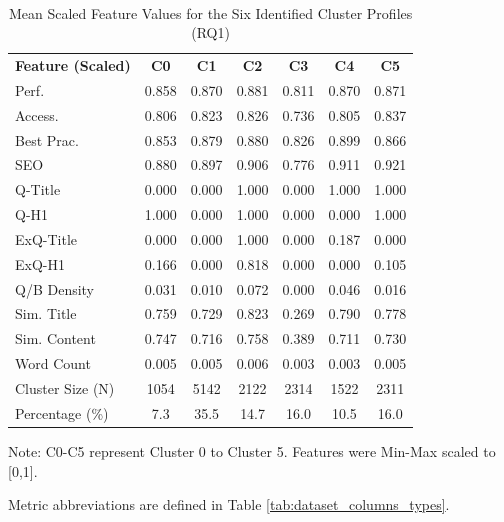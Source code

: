 \documentclass[a4paper,fleqn]{cas-sc}
\newcommand{\sbf}[1]{\scriptsize\textbf{#1}}
\newcommand{\dmidrule}{\specialrule{0.8pt}{0pt}{0.4pt}\specialrule{0.8pt}{0pt}{0pt}}
\begin{document}
\begin{table}[htbp!]
\centering
\caption{Mean Scaled Feature Values for the Six Identified Cluster Profiles (RQ1)}
\label{tab:rq1_cluster_summary}
\small 
\setlength{\tabcolsep}{3pt}
\renewcommand{\arraystretch}{1}
\begin{tabular*}{\textwidth}{l@{\extracolsep{\fill}} S[table-format=1.3] S[table-format=1.3] S[table-format=1.3] S[table-format=1.3] S[table-format=1.3] S[table-format=1.3] }
\toprule
\sbf{Feature (Scaled)} & {{\sbf{C0}}} & {{\sbf{C1}}} & {{\sbf{C2}}} & {{\sbf{C3}}} & {{\sbf{C4}}} & {{\sbf{C5}}} \\
\dmidrule
Perf. & 0.858 & 0.870 & 0.881 & 0.811 & 0.870 & 0.871 \\
Access. & 0.806 & 0.823 & 0.826 & 0.736 & 0.805 & 0.837 \\
Best Prac. & 0.853 & 0.879 & 0.880 & 0.826 & 0.899 & 0.866 \\
SEO & 0.880 & 0.897 & 0.906 & 0.776 & 0.911 & 0.921 \\
Q-Title & 0.000 & 0.000 & 1.000 & 0.000 & 1.000 & 1.000 \\
Q-H1 & 1.000 & 0.000 & 1.000 & 0.000 & 0.000 & 1.000 \\
ExQ-Title & 0.000 & 0.000 & 1.000 & 0.000 & 0.187 & 0.000 \\
ExQ-H1 & 0.166 & 0.000 & 0.818 & 0.000 & 0.000 & 0.105 \\
Q/B Density & 0.031 & 0.010 & 0.072 & 0.000 & 0.046 & 0.016 \\
Sim. Title & 0.759 & 0.729 & 0.823 & 0.269 & 0.790 & 0.778 \\
Sim. Content & 0.747 & 0.716 & 0.758 & 0.389 & 0.711 & 0.730 \\
Word Count & 0.005 & 0.005 & 0.006 & 0.003 & 0.003 & 0.005 \\
\midrule
Cluster Size (N) & {1054} & {5142} & {2122} & {2314} & {1522} & {2311} \\
Percentage (\%) & {7.3} & {35.5} & {14.7} & {16.0} & {10.5} & {16.0} \\
\bottomrule
\end{tabular*}
\begin{tablenotes}[flushleft]
\scriptsize
\item Note: C0-C5 represent Cluster 0 to Cluster 5. Features were Min-Max scaled to [0,1].
\item Metric abbreviations are defined in Table \ref{tab:dataset_columns_types}.
\end{tablenotes}
\end{table}
\end{document}
